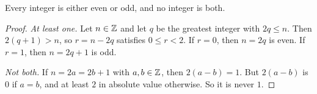 \begin{theorem}[Parity]\label{thm:parity}
  Every integer is either even or odd, and no integer is both.
\end{theorem}

\begin{proof}
  \emph{At least one.} Let $n \in \mathbb{Z}$ and let $q$ be the greatest integer with
  $2q \leq n$. Then $2(q + 1) > n$, so $r = n - 2q$ satisfies $0 \leq r < 2$.
  If $r = 0$, then $n = 2q$ is even. If $r = 1$, then $n = 2q + 1$ is odd.

  \emph{Not both.} If $n = 2a = 2b + 1$ with $a, b \in \mathbb{Z}$, then
  $2(a - b) = 1$. But $2(a - b)$ is $0$ if $a = b$, and at least $2$ in
  absolute value otherwise. So it is never $1$.
\end{proof}
